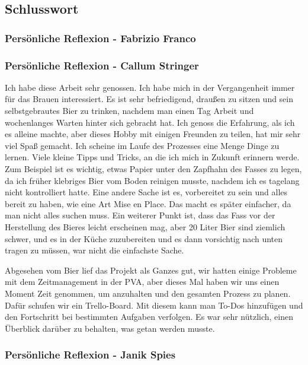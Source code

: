 \subsection{Schlusswort}
\subsubsection{Persönliche Reflexion - Fabrizio Franco}
\subsubsection{Persönliche Reflexion - Callum Stringer}
Ich habe diese Arbeit sehr genossen. Ich habe mich in der Vergangenheit immer für das Brauen interessiert. Es ist sehr befriedigend, draußen zu sitzen und sein selbstgebrautes Bier zu trinken, nachdem man einen Tag Arbeit und wochenlanges Warten hinter sich gebracht hat.
Ich genoss die Erfahrung, als ich es alleine machte, aber dieses Hobby mit einigen Freunden zu teilen, hat mir sehr viel Spaß gemacht.
Ich scheine im Laufe des Prozesses eine Menge Dinge zu lernen. Viele kleine Tipps und Tricks, an die ich mich in Zukunft erinnern werde.
Zum Beispiel ist es wichtig, etwas Papier unter den Zapfhahn des Fasses zu legen, da ich früher klebriges Bier vom Boden reinigen musste,
nachdem ich es tagelang nicht kontrolliert hatte.
Eine andere Sache ist es, vorbereitet zu sein und alles bereit zu haben, wie eine Art Mise en Place. Das macht es später einfacher, da man
nicht alles suchen muss.
Ein weiterer Punkt ist, dass das Fass vor der Herstellung des Bieres leicht erscheinen mag, aber 20 Liter Bier sind ziemlich schwer,
und es in der Küche zuzubereiten und es dann vorsichtig nach unten tragen zu müssen, war nicht die einfachste Sache.

Abgesehen vom Bier lief das Projekt als Ganzes gut, wir hatten einige Probleme mit dem Zeitmanagement in der PVA, aber dieses Mal haben wir uns einen Moment Zeit genommen, um anzuhalten und den gesamten Prozess zu planen. Dafür schufen wir ein Trello-Board. Mit diesem kann man To-Dos hinzufügen und den Fortschritt bei bestimmten Aufgaben verfolgen. Es war sehr nützlich, einen Überblick darüber zu behalten, was getan werden musste.

\subsubsection{Persönliche Reflexion - Janik Spies}
